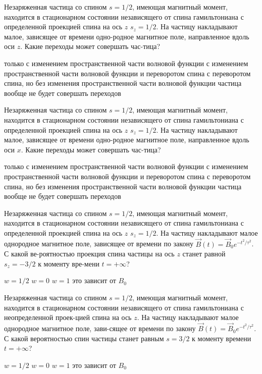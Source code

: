 \documentclass[11pt,a4paper]{exam}
\begin{document}
\begin{questions}
\question Незаряженная частица со спином $s = 1/2$, имеющая магнитный момент, находится в стационарном состоянии независящего от спина гамильтониана с определенной проекцией спина на ось $z$ ${s_z} = 1/2$. На частицу накладывают малое, зависящее от времени одно-родное магнитное поле, направленное вдоль оси $z$. Какие переходы может совершать час-тица?
\begin{choices}
\choice только с изменением пространственной части волновой функции
\choice с изменением пространственной части волновой функции и переворотом спина
\choice с переворотом спина, но без изменения пространственной части волновой функции
\choice частица вообще не будет совершать переходов
\end{choices}

\question Незаряженная частица со спином $s = 1/2$, имеющая магнитный момент, находится в стационарном состоянии независящего от спина гамильтониана с определенной проекцией спина на ось $z$ ${s_z} = 1/2$. На частицу накладывают малое, зависящее от времени одно-родное магнитное поле, направленное вдоль оси $x$. Какие переходы может совершать час-тица?
\begin{choices}
\choice только с изменением пространственной части волновой функции
\choice с изменением пространственной части волновой функции и переворотом спина
\choice с переворотом спина, но без изменения пространственной части волновой функции
\choice частица вообще не будет совершать переходов
\end{choices}

\question Незаряженная частица со спином $s = 1/2$, имеющая магнитный момент, находится в стационарном состоянии независящего от спина гамильтониана с определенной проекцией спина на ось $z$ ${s_z} = 1/2$. На частицу накладывают малое однородное магнитное поле, зависящее от времени по закону $\vec B(t) = {\vec B_0}{e^{ - {t^2}/{\tau ^2}}}$. С какой ве-роятностью проекция спина частицы на ось $z$ станет равной ${s_z} =  - 3/2$ к моменту вре-мени $t =  + \infty $?
\begin{choices}
\choice $w = 1/2$   
\choice $w = 0$  
\choice $w = 1$  
\choice это зависит от ${B_0}$
\end{choices}

\question Незаряженная частица со спином $s = 1/2$, имеющая магнитный момент, находится в стационарном состоянии независящего от спина гамильтониана с неопределенной проек-цией спина на ось $z$. На частицу накладывают малое однородное магнитное поле, зави-сящее от времени по закону $\vec B(t) = {\vec B_0}{e^{ - {t^2}/{\tau ^2}}}$. С какой вероятностью спин частицы станет равным $s = 3/2$ к моменту времени $t =  + \infty $?
\begin{choices}
\choice $w = 1/2$   
\choice $w = 0$  
\choice $w = 1$  
\choice это зависит от ${B_0}$
\end{choices}

\end{questions}
\end{document}
